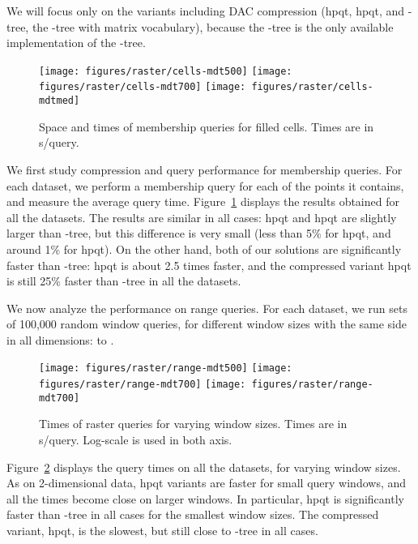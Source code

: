 \documentclass{elsarticle}
\newcommand{\koct}{-tree\xspace}
\newcommand{\koctdac}{-tree\xspace}
\newcommand{\hpqt}{\textsf{hpqt}\xspace}
\newcommand{\hpqtpdac}{\textsf{hpqt}\xspace}
\newcommand{\hpqtRdac}{\textsf{hpqt}\xspace}
\begin{document}
We will focus only on the variants including DAC compression (\hpqtpdac, \hpqtRdac, and \koctdac, the \koct with matrix vocabulary), because the \koctdac is the only available implementation of the \koct.

\begin{figure}[t]
 \centering
    \texttt{[image: figures/raster/cells-mdt500]}
    \texttt{[image: figures/raster/cells-mdt700]}
     \texttt{[image: figures/raster/cells-mdtmed]}
  \caption{Space and times of membership queries for filled cells. Times are in s/query.}
  \label{fig:rastermember}
\end{figure}

We first study compression and query performance for membership queries. For each dataset, we perform a membership query for each of the points it contains, and measure the average query time. Figure~\ref{fig:rastermember} displays the results obtained for all the datasets. The results are similar in all cases: \hpqtpdac and \hpqtRdac are slightly larger than \koctdac, but this difference is very small (less than 5\% for \hpqtpdac, and around 1\% for \hpqtRdac). On the other hand, both of our solutions are significantly faster than \koctdac: \hpqtpdac is about 2.5 times faster, and the compressed variant \hpqtRdac is still 25\% faster than \koctdac in all the datasets.

We now analyze the performance on range queries. For each dataset, we run sets of 100,000 random window queries, for different window sizes with the same side in all dimensions:  to . 

\begin{figure}[t]
 \centering
    \texttt{[image: figures/raster/range-mdt500]}
    \texttt{[image: figures/raster/range-mdt700]}
    \texttt{[image: figures/raster/range-mdt700]}
  \caption{Times of raster queries for varying window sizes. Times are in s/query. Log-scale is used in both axis.}
  \label{fig:rasterwindow}
\end{figure}

Figure~\ref{fig:rasterwindow} displays the query times on all the datasets, for varying window sizes. As on 2-dimensional data, \hpqt variants are faster for small query windows, and all the times become close on larger windows. In particular, \hpqtpdac is significantly faster than \koctdac in all cases for the smallest window sizes. The compressed variant, \hpqtRdac, is the slowest, but still close to \koctdac in all cases. 
\end{document}
